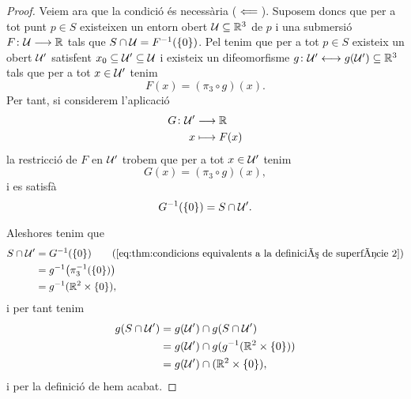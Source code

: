 \documentclass[../../Main.tex]{subfiles}
\begin{document}
\begin{theorem}
\begin{proof}
			Veiem ara que la condició és necessària (\(\impliedby\)). Suposem doncs que per a tot punt \(p\in S\) existeixen un entorn obert \(\mathcal{U}\subseteq\mathbb{R}^{3}\) de \(p\) i una submersió \(F\colon\mathcal{U}\longrightarrow\mathbb{R}\) tals que \(S\cap\mathcal{U}=F^{-1}(\{0\})\). Pel  tenim que per a tot \(p\in S\) existeix un obert \(\mathcal{U}'\) satisfent \(x_{0}\subseteq\mathcal{U}'\subseteq\mathcal{U}\) i existeix un difeomorfisme \(g\colon\mathcal{U}'\longleftrightarrow g(\mathcal{U}')\subseteq\mathbb{R}^{3}\) tals que per a tot \(x\in\mathcal{U}'\) tenim
			\[
			    F(x)=(\pi_{3}\circ g)(x).
			\]
			Per tant, si considerem l'aplicació
			\begin{align*}
				G\colon\mathcal{U}'&\longrightarrow\mathbb{R} \\
				x&\longmapsto F(x)
			\end{align*}
			la restricció de \(F\) en \(\mathcal{U}'\) trobem que per a tot \(x\in\mathcal{U}'\) tenim
			\[
			    G(x)=(\pi_{3}\circ g)(x),
			\]
			i es satisfà
			\begin{equation}
				\label{eq:thm:condicions equivalents a la definició de superfície 2}
				G^{-1}(\{0\})=S\cap\mathcal{U}'.
			\end{equation}
			
			Aleshores tenim que
			\begin{align*}
				S\cap\obert{U}'&=G^{-1}(\{0\}) \tag{\ref{eq:thm:condicions equivalents a la definició de superfície 2}}\\
				&=g^{-1}\big(\pi_{3}^{-1}(\{0\})\big) \\
				&=g^{-1}(\mathbb{R}^{2}\times\{0\}),
			\end{align*}
			i per tant tenim
			\begin{align*}
				g(S\cap\mathcal{U}')&=g(\mathcal{U}')\cap g(S\cap\mathcal{U}') \\
				&=g(\mathcal{U}')\cap g(g^{-1}(\mathbb{R}^{2}\times\{0\})) \\
				&=g(\mathcal{U}')\cap(\mathbb{R}^{2}\times\{0\}),
			\end{align*}
			i per la definició de  hem acabat.
		\end{proof}
	\end{theorem}
\end{document}
